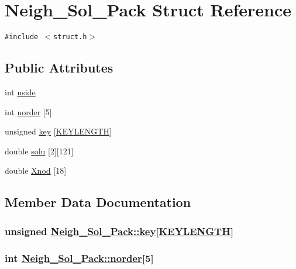 \hypertarget{structNeigh__Sol__Pack}{
\section{Neigh\_\-Sol\_\-Pack Struct Reference}
\label{structNeigh__Sol__Pack}
}
{\tt \#include $<$struct.h$>$}

\subsection*{Public Attributes}
\begin{CompactItemize}
\item 
int \hyperlink{structNeigh__Sol__Pack_o0}{nside}
\item 
int \hyperlink{structNeigh__Sol__Pack_o1}{norder} \mbox{[}5\mbox{]}
\item 
unsigned \hyperlink{structNeigh__Sol__Pack_o2}{key} \mbox{[}\hyperlink{constant_8h_a10}{KEYLENGTH}\mbox{]}
\item 
double \hyperlink{structNeigh__Sol__Pack_o3}{solu} \mbox{[}2\mbox{]}\mbox{[}121\mbox{]}
\item 
double \hyperlink{structNeigh__Sol__Pack_o4}{Xnod} \mbox{[}18\mbox{]}
\end{CompactItemize}


\subsection{Member Data Documentation}
\hypertarget{structNeigh__Sol__Pack_o2}{
\subsubsection[key]{\setlength{\rightskip}{0pt plus 5cm}unsigned \hyperlink{structNeigh__Sol__Pack_o2}{Neigh\_\-Sol\_\-Pack::key}\mbox{[}\hyperlink{constant_8h_a10}{KEYLENGTH}\mbox{]}}}
\label{structNeigh__Sol__Pack_o2}


\hypertarget{structNeigh__Sol__Pack_o1}{
\subsubsection[norder]{\setlength{\rightskip}{0pt plus 5cm}int \hyperlink{structNeigh__Sol__Pack_o1}{Neigh\_\-Sol\_\-Pack::norder}\mbox{[}5\mbox{]}}}
\label{structNeigh__Sol__Pack_o1}


